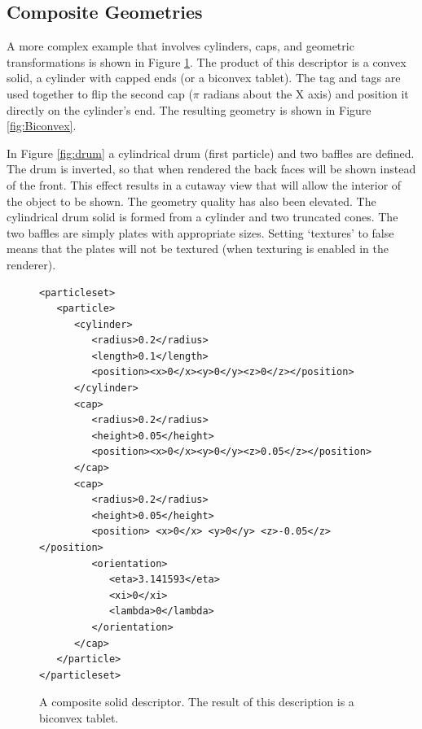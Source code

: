 \subsection{Composite Geometries}

A more complex example that involves cylinders, caps, and geometric transformations is shown in Figure \ref{fig:composite}.
The product of this descriptor is a convex solid, a cylinder with capped ends (or a biconvex tablet).
The  tag and  tags are used together to flip the second cap ($\pi$ radians about the X axis) and position it directly on the cylinder's end.  The resulting geometry is shown in Figure \ref{fig:Biconvex}.

In Figure \ref{fig:drum} a cylindrical drum (first particle) and two baffles are defined.  The drum is inverted, so that when rendered the back faces will be shown instead of the front.  This effect results in a cutaway view that will allow the interior of the object to be shown.  The geometry quality has also been elevated.  The cylindrical drum solid is formed from a cylinder and two truncated cones.  The two baffles are simply plates with appropriate sizes.  Setting `textures' to false means that the plates will not be textured (when texturing is enabled in the renderer).

\begin{figure}
\begin{small}
\begin{verbatim}
<particleset>
   <particle>
      <cylinder>
         <radius>0.2</radius>
         <length>0.1</length>
         <position><x>0</x><y>0</y><z>0</z></position>
      </cylinder>
      <cap>
         <radius>0.2</radius>
         <height>0.05</height>
         <position><x>0</x><y>0</y><z>0.05</z></position>
      </cap>
      <cap>
         <radius>0.2</radius>
         <height>0.05</height>
         <position> <x>0</x> <y>0</y> <z>-0.05</z> </position>
         <orientation>
            <eta>3.141593</eta>
            <xi>0</xi>
            <lambda>0</lambda>
         </orientation>
      </cap>
   </particle>
</particleset>
\end{verbatim}
\end{small}
 \caption[A composite solid descriptor]{A composite solid descriptor.  The result of this description is a biconvex tablet.}
 \label{fig:composite}
\end{figure}

